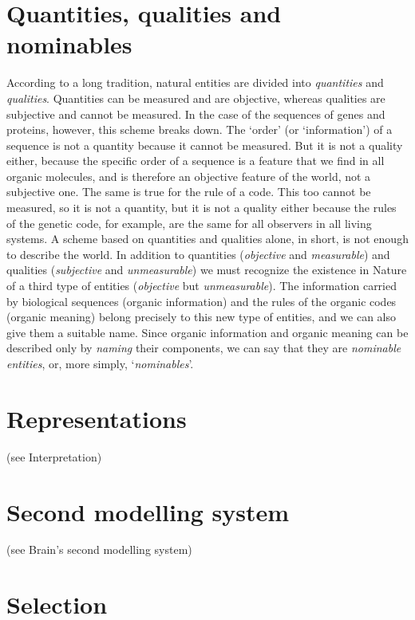 \documentclass[12pt]{article}
\begin{document}
\section{Quantities, qualities and nominables}
According to a long tradition, natural entities are divided into \textit{quantities} and \textit{qualities}. Quantities can be measured and are objective, whereas qualities are subjective and cannot be measured. In the case of the sequences of genes and proteins, however, this scheme breaks down. The `order' (or `information') of a sequence is not a quantity because it cannot be measured. But it is not a quality either, because the specific order of a sequence is a feature that we find in all organic molecules, and is therefore an objective feature of the world, not a subjective one. The same is true for the rule of a code. This too cannot be measured, so it is not a quantity, but it is not a quality either because the rules of the genetic code, for example, are the same for all observers in all living systems. A scheme based on quantities and qualities alone, in short, is not enough to describe the world. In addition to quantities (\textit{objective} and \textit{measurable}) and qualities (\textit{subjective} and \textit{unmeasurable}) we must recognize the existence in Nature of a third type of entities (\textit{objective} but \textit{unmeasurable}). The information carried by biological sequences (organic information) and the rules of the organic codes (organic meaning) belong precisely to this new type of entities, and we can also give them a suitable name. Since organic information and organic meaning can be described only by \textit{naming} their components, we can say that they are \textit{nominable entities}, or, more simply, `\textit{nominables}'.


\section{Representations} (see Interpretation)


\section{Second modelling system} (see Brain's second modelling system)

\hypertarget{selection}{}
\section{Selection}
\end{document}
